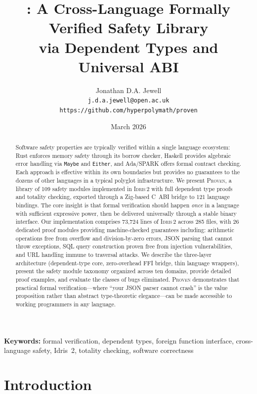 \documentclass[11pt,a4paper]{article}
\title{\textbf{\proven{}: A Cross-Language Formally Verified Safety Library\\
via Dependent Types and Universal ABI}}
\author{
  Jonathan D.A. Jewell\\
  \texttt{j.d.a.jewell@open.ac.uk}\\
  \texttt{https://github.com/hyperpolymath/proven}
}
\date{March 2026}
\newcommand{\proven}{\textsc{Proven}}
\newcommand{\idris}{\textsc{Idris\,2}}
\newcommand{\code}[1]{\texttt{#1}}
\begin{document}
\maketitle

\begin{abstract}
Software safety properties are typically verified within a single language
ecosystem: Rust enforces memory safety through its borrow checker, Haskell
provides algebraic error handling via \code{Maybe} and \code{Either}, and
Ada/SPARK offers formal contract checking. Each approach is effective within
its own boundaries but provides no guarantees to the dozens of other
languages in a typical polyglot infrastructure. We present \proven{}, a
library of 109 safety modules implemented in \idris{} with full dependent
type proofs and totality checking, exported through a Zig-based C~ABI
bridge to 121 language bindings. The core insight is that formal
verification should happen \emph{once} in a language with sufficient
expressive power, then be delivered universally through a stable binary
interface. Our implementation comprises 73,724 lines of \idris{} across 285
files, with 26 dedicated proof modules providing machine-checked guarantees
including: arithmetic operations free from overflow and division-by-zero
errors, JSON parsing that cannot throw exceptions, SQL query construction
proven free from injection vulnerabilities, and URL handling immune to
traversal attacks. We describe the three-layer architecture (dependent-type
core, zero-overhead FFI bridge, thin language wrappers), present the safety
module taxonomy organized across ten domains, provide detailed proof
examples, and evaluate the classes of bugs eliminated. \proven{} demonstrates
that practical formal verification---where ``your JSON parser cannot crash''
is the value proposition rather than abstract type-theoretic
elegance---can be made accessible to working programmers in any language.
\end{abstract}

\noindent\textbf{Keywords:} formal verification, dependent types, foreign
function interface, cross-language safety, Idris~2, totality checking,
software correctness

\section{Introduction}
\label{sec:introduction}
\end{document}

